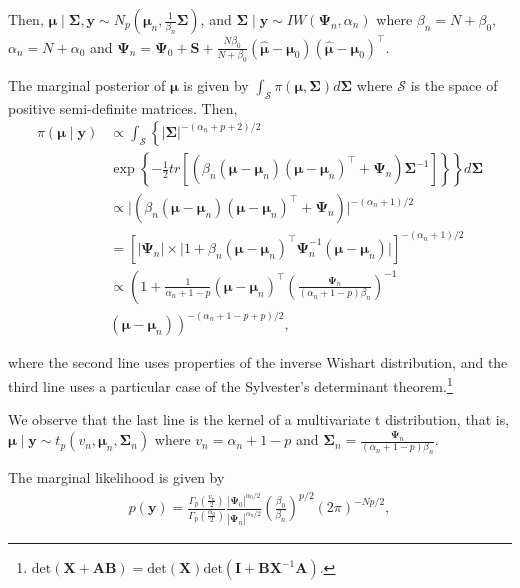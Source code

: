 \begin{enumerate}
Then, $\bm{\mu}\mid \bm{\Sigma},\bm{y}\sim N_p\left(\bm{\mu}_n,\frac{1}{\beta_n}\bm{\Sigma}\right)$, and $\bm{\Sigma}\mid \bm{y}\sim IW\left(\bm{\Psi}_n,\alpha_n\right)$ where $\beta_n=N+\beta_0$, $\alpha_n=N+\alpha_0$ and $\bm{\Psi}_n=\bm{\Psi}_0+\bm{S}+\frac{N\beta_0}{N+\beta_0}(\hat{\bm{\mu}}-\bm{\mu}_0)(\hat{\bm{\mu}}-\bm{\mu}_0)^{\top}$.

The marginal posterior of $\bm{\mu}$ is given by $\int_{\mathcal{S}} \pi(\bm{\mu},\bm{\Sigma})d\bm{\Sigma}$ where $\mathcal{S}$ is the space of positive semi-definite matrices. Then,
\begin{align*}
	\pi(\bm{\mu}\mid \bm{y})&\propto\int_{\mathcal{S}}\left\{|\bm{\Sigma}|^{-(\alpha_n+p+2)/2}\right.\\
	&\left. \exp\left\{-\frac{1}{2}tr\left[\left(\beta_n\left(\bm{\mu}-\bm{\mu}_n\right)\left(\bm{\mu}-\bm{\mu}_n\right)^{\top}+\bm{\Psi}_n\right)\bm{\Sigma}^{-1}\right]\right\} \right\}d\bm{\Sigma}\\
	&\propto \big\lvert\left(\beta_n\left(\bm{\mu}-\bm{\mu}_n\right)\left(\bm{\mu}-\bm{\mu}_n\right)^{\top}+\bm{\Psi}_n\right)\big\lvert^{-(\alpha_n+1)/2}\\
	&=\left[\big\lvert\bm{\Psi}_n\big\lvert\times \big\lvert1+\beta_n\left(\bm{\mu}-\bm{\mu}_n\right)^{\top}\bm{\Psi}_n^{-1}\left(\bm{\mu}-\bm{\mu}_n\right)\big\lvert\right]^{-(\alpha_n+1)/2}\\
	&\propto \left(1+\frac{1}{\alpha_n+1-p}\left(\bm{\mu}-\bm{\mu}_n\right)^{\top}\left(\frac{\bm{\Psi}_n}{(\alpha_n+1-p)\beta_n}\right)^{-1}\right.\\
	&\left.\left(\bm{\mu}-\bm{\mu}_n\right)\right)^{-(\alpha_n+1-p+p)/2},
\end{align*}


where the second line uses properties of the inverse Wishart distribution, and the third line uses a particular case of the Sylvester's determinant theorem.\footnote{$\text{det}(\boldsymbol{X}+\boldsymbol{A}\boldsymbol{B})=\text{det}(\boldsymbol{X})\text{det}(\boldsymbol{I}+\boldsymbol{B}\boldsymbol{X}^{-1}\boldsymbol{A})$.}

We observe that the last line is the kernel of a multivariate t distribution, that is, $\bm{\mu}\mid \bm{y}\sim t_p(v_n,\bm{\mu}_n,\bm{\Sigma}_n)$ where $v_n=\alpha_n+1-p$ and $\bm{\Sigma}_n=\frac{\bm{\Psi}_n}{(\alpha_n+1-p)\beta_n}$.

The marginal likelihood is given by
\begin{align}
	p(\bm{y})=\frac{\Gamma_p\left(\frac{v_n}{2}\right)}{\Gamma_p\left(\frac{\alpha_0}{2}\right)}\frac{|\bm{\Psi}_0|^{\alpha_0/2}}{|\bm{\Psi}_n|^{\alpha_n/2}}\left(\frac{\beta_0}{\beta_n}\right)^{p/2}(2\pi)^{-Np/2},\nonumber
\end{align}


\end{enumerate}
